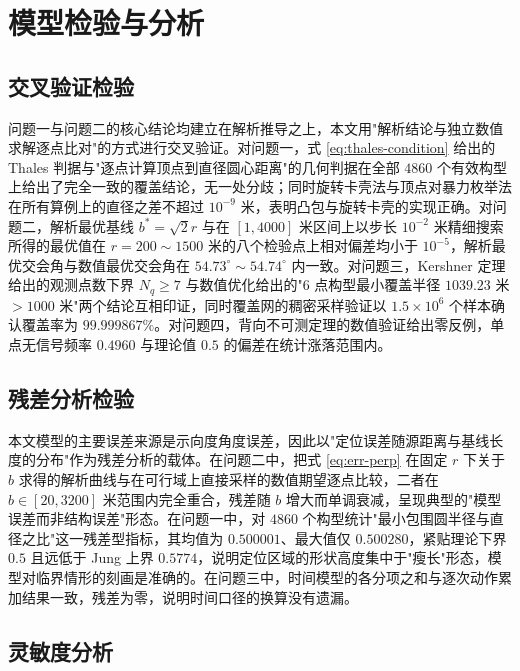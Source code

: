 \documentclass[12pt,a4paper]{ctexart}
\begin{document}
\section{模型检验与分析}

\subsection{交叉验证检验}

问题一与问题二的核心结论均建立在解析推导之上，本文用"解析结论与独立数值求解逐点比对"的方式进行交叉验证。对问题一，式 \eqref{eq:thales-condition} 给出的 Thales 判据与"逐点计算顶点到直径圆心距离"的几何判据在全部 $4860$ 个有效构型上给出了完全一致的覆盖结论，无一处分歧；同时旋转卡壳法与顶点对暴力枚举法在所有算例上的直径之差不超过 $10^{-9}$ 米，表明凸包与旋转卡壳的实现正确。对问题二，解析最优基线 $b^*=\sqrt2r$ 与在 $[1,4000]$ 米区间上以步长 $10^{-2}$ 米精细搜索所得的最优值在 $r=200\sim1500$ 米的八个检验点上相对偏差均小于 $10^{-5}$，解析最优交会角与数值最优交会角在 $54.73^\circ\sim54.74^\circ$ 内一致。对问题三，Kershner 定理给出的观测点数下界 $N_q\ge7$ 与数值优化给出的"$6$ 点构型最小覆盖半径 $1039.23$ 米 $>1000$ 米"两个结论互相印证，同时覆盖网的稠密采样验证以 $1.5\times10^6$ 个样本确认覆盖率为 $99.999867\%$。对问题四，背向不可测定理的数值验证给出零反例，单点无信号频率 $0.4960$ 与理论值 $0.5$ 的偏差在统计涨落范围内。

\subsection{残差分析检验}

本文模型的主要误差来源是示向度角度误差，因此以"定位误差随源距离与基线长度的分布"作为残差分析的载体。在问题二中，把式 \eqref{eq:err-perp} 在固定 $r$ 下关于 $b$ 求得的解析曲线与在可行域上直接采样的数值期望逐点比较，二者在 $b\in[20,3200]$ 米范围内完全重合，残差随 $b$ 增大而单调衰减，呈现典型的"模型误差而非结构误差"形态。在问题一中，对 $4860$ 个构型统计"最小包围圆半径与直径之比"这一残差型指标，其均值为 $0.500001$、最大值仅 $0.500280$，紧贴理论下界 $0.5$ 且远低于 Jung 上界 $0.5774$，说明定位区域的形状高度集中于"瘦长"形态，模型对临界情形的刻画是准确的。在问题三中，时间模型的各分项之和与逐次动作累加结果一致，残差为零，说明时间口径的换算没有遗漏。

\subsection{灵敏度分析}
\end{document}
